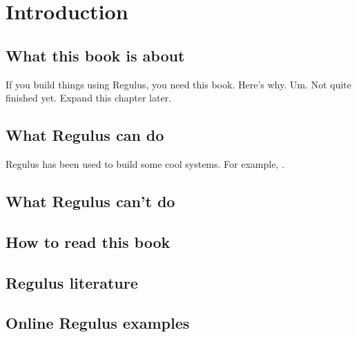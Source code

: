\chapter{Introduction}
\label{Chapter:Introduction}

\author{Manny Rayner}

\section{What this book is about}
If you build things using Regulus, you need this book. Here's why. 
Um. Not quite finished yet. Expand this chapter later.

\section{What Regulus can do}

Regulus has been used to build some cool systems. For example,
\citep{RaynerEA2005ClarissaACL,BouillonEAMT2005MedSLT}.

\section{What Regulus can't do}
 
\section{How to read this book}

\section{Regulus literature}

\section{Online Regulus examples}
